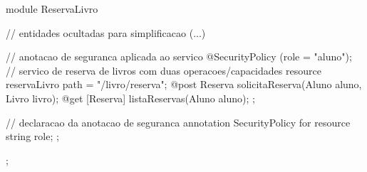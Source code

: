module  ReservaLivro {
 // entidades ocultadas para simplificacao
 (...) 

 // anotacao de seguranca aplicada ao servico
 @SecurityPolicy (role = "aluno");
 // servico de reserva de livros com duas operacoes/capacidades
 resource reservaLivro { 
  path = "/livro/reserva";
  @post Reserva solicitaReserva(Aluno aluno, Livro livro); 
  @get [Reserva] listaReservas(Aluno aluno); 
 };
 
 // declaracao da anotacao de seguranca
  annotation SecurityPolicy for resource {
   string role;
 };
 
};